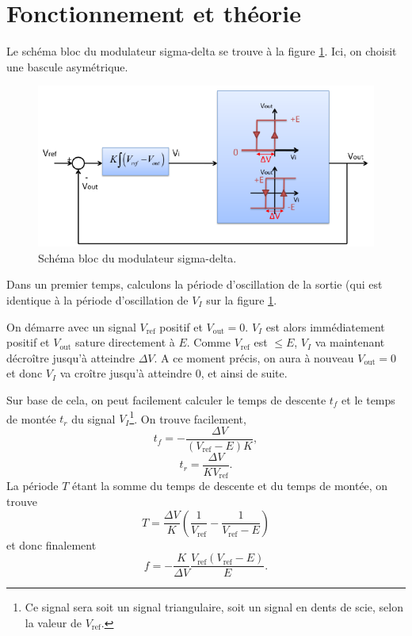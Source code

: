 

\section{Fonctionnement et théorie}
Le schéma bloc du modulateur sigma-delta se trouve
à la figure \ref{fig:sigma-delta-schema-blocs}. Ici,
on choisit une bascule asymétrique.

\begin{figure}[ht]
	\centering
	\includegraphics[scale=0.75]{img/schema-blocs.png}
	\caption{Schéma bloc du modulateur sigma-delta.}
	\label{fig:sigma-delta-schema-blocs}
\end{figure}

Dans un premier temps, calculons la période
d'oscillation de la sortie (qui est identique
à la période d'oscillation de $V_I$ sur la figure
\ref{fig:sigma-delta-schema-blocs}.

On démarre avec un signal $V_{\text{ref}}$ positif et
$V_{\text{out}} = 0$. $V_I$ est alors immédiatement positif
et $V_{\text{out}}$ sature directement à $E$. Comme $V_{\text{ref}}$
est $\leq E$, $V_I$ va maintenant décroître jusqu'à atteindre
$\Delta V$. A ce moment précis, on aura à nouveau $V_{\text{out}} = 0$
et donc $V_I$ va croître jusqu'à atteindre 0, et ainsi de suite.

Sur base de cela, on peut facilement calculer
le temps de descente $t_f$ et le temps de montée $t_r$
du signal $V_I$\footnote{Ce signal sera soit un signal triangulaire,
soit un signal en dents de scie, selon la valeur de $V_{\text{ref}}$.}.
On trouve facilement,
\[ t_f = -\frac{\Delta V}{(V_{\text{ref}} - E)K},\]
\[ t_r = \frac{\Delta V}{KV_{\text{ref}}}.\]
La période $T$ étant la somme du temps de descente et du temps
de montée, on trouve
\[ T = \frac{\Delta V}{K}\left(\frac{1}{V_{\text{ref}}} - \frac{1}{V_{\text{ref}} - E}\right)\]
et donc finalement
\begin{equation} 
	f = -\frac{K}{\Delta V} \frac{V_{\text{ref}}(V_{\text{ref}}-E)}{E}.
	\label{eq:sigma-delta-frequency}
\end{equation}

